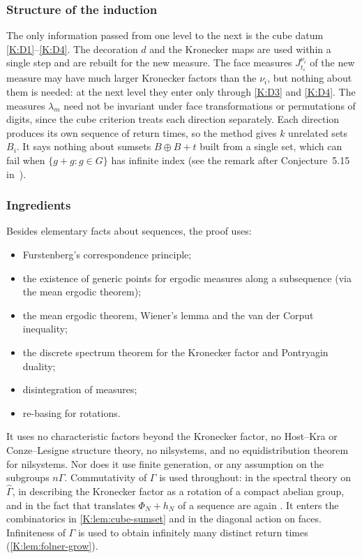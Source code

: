 \subsubsection*{Structure of the induction}
The only information passed from one level to the next is the cube datum
\ref{K:D1}--\ref{K:D4}. The decoration $d$ and the Kronecker maps are used within a single
step and are rebuilt for the new measure. The face measures $J^{\nu_i}_{t_i}$ of the new
measure may have much larger Kronecker factors than the $\nu_i$, but nothing about them is
needed: at the next level they enter only through \ref{K:D3} and \ref{K:D4}.
The measures $\lambda_m$ need not be invariant under face transformations or permutations
of digits, since the cube criterion treats each direction separately. Each direction
produces its own sequence of return times, so the method gives $k$ unrelated sets $B_i$.
It says nothing about sumsets $B\oplus B+t$ built from a single set, which can fail when
$\{g+g:g\in G\}$ has infinite index (see the remark after Conjecture~5.15
in~\cite{kra2023problems}).

\subsubsection*{Ingredients}
Besides elementary facts about \Fol{} sequences, the proof uses:
\begin{itemize}
\item Furstenberg's correspondence principle;
\item the existence of generic points for ergodic measures along a subsequence (via the mean
ergodic theorem);
\item the mean ergodic theorem, Wiener's lemma and the van der Corput inequality;
\item the discrete spectrum theorem for the Kronecker factor and Pontryagin duality;
\item disintegration of measures;
\item re-basing for rotations.
\end{itemize}
It uses no characteristic factors beyond the Kronecker factor, no Host--Kra or
Conze--Lesigne structure theory, no nilsystems, and no equidistribution theorem for
nilsystems. Nor does
it use finite generation, or any assumption on the subgroups $n\Gamma$.
Commutativity of $\Gamma$ is used throughout: in the spectral theory on $\widehat\Gamma$, in
describing the Kronecker factor as a rotation of a compact abelian group, and in the fact
that translates $\Phi_N+h_N$ of a \Fol{} sequence are again \Fol{}. It enters the
combinatorics in \cref{K:lem:cube-sumset} and in the diagonal action on faces.
Infiniteness of $\Gamma$ is used to obtain infinitely many distinct return times
(\cref{K:lem:folner-grow}).

